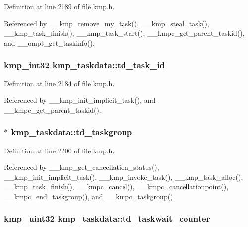 Definition at line 2189 of file kmp.\-h.



Referenced by \-\_\-\-\_\-kmp\-\_\-remove\-\_\-my\-\_\-task(), \-\_\-\-\_\-kmp\-\_\-steal\-\_\-task(), \-\_\-\-\_\-kmp\-\_\-task\-\_\-finish(), \-\_\-\-\_\-kmp\-\_\-task\-\_\-start(), \-\_\-\-\_\-kmpc\-\_\-get\-\_\-parent\-\_\-taskid(), and \-\_\-\-\_\-ompt\-\_\-get\-\_\-taskinfo().

\hypertarget{structkmp__taskdata_a5e7bd3946ccea8fd5789f703a628344f}{
\subsubsection[{td\-\_\-task\-\_\-id}]{\setlength{\rightskip}{0pt plus 5cm}kmp\-\_\-int32 kmp\-\_\-taskdata\-::td\-\_\-task\-\_\-id}}\label{structkmp__taskdata_a5e7bd3946ccea8fd5789f703a628344f}


Definition at line 2184 of file kmp.\-h.



Referenced by \-\_\-\-\_\-kmp\-\_\-init\-\_\-implicit\-\_\-task(), and \-\_\-\-\_\-kmpc\-\_\-get\-\_\-parent\-\_\-taskid().

\hypertarget{structkmp__taskdata_a568185a9e8c23a1682491fa55973d61c}{
\subsubsection[{td\-\_\-taskgroup}]{$\ast$ kmp\-\_\-taskdata\-::td\-\_\-taskgroup}}\label{structkmp__taskdata_a568185a9e8c23a1682491fa55973d61c}


Definition at line 2200 of file kmp.\-h.



Referenced by \-\_\-\-\_\-kmp\-\_\-get\-\_\-cancellation\-\_\-status(), \-\_\-\-\_\-kmp\-\_\-init\-\_\-implicit\-\_\-task(), \-\_\-\-\_\-kmp\-\_\-invoke\-\_\-task(), \-\_\-\-\_\-kmp\-\_\-task\-\_\-alloc(), \-\_\-\-\_\-kmp\-\_\-task\-\_\-finish(), \-\_\-\-\_\-kmpc\-\_\-cancel(), \-\_\-\-\_\-kmpc\-\_\-cancellationpoint(), \-\_\-\-\_\-kmpc\-\_\-end\-\_\-taskgroup(), and \-\_\-\-\_\-kmpc\-\_\-taskgroup().

\hypertarget{structkmp__taskdata_a11a22c35abf51fc2e20a7559001a1e72}{
\subsubsection[{td\-\_\-taskwait\-\_\-counter}]{\setlength{\rightskip}{0pt plus 5cm}kmp\-\_\-uint32 kmp\-\_\-taskdata\-::td\-\_\-taskwait\-\_\-counter}}\label{structkmp__taskdata_a11a22c35abf51fc2e20a7559001a1e72}


